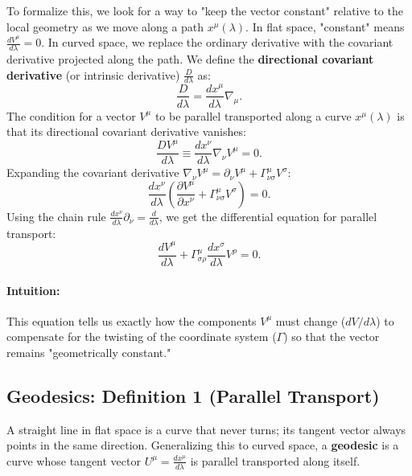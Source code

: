 \documentclass[11pt, a4paper]{report}
\begin{document}
To formalize this, we look for a way to "keep the vector constant" relative to the local geometry as we move along a path \(x^\mu(\lambda)\). In flat space, "constant" means \(\frac{d V^\mu}{d\lambda} = 0\). In curved space, we replace the ordinary derivative with the covariant derivative projected along the path. We define the \textbf{directional covariant derivative} (or intrinsic derivative) \(\frac{D}{d\lambda}\) as:
\begin{equation}
\frac{D}{d\lambda} = \frac{dx^\mu}{d\lambda} \nabla_\mu.
\end{equation}
The condition for a vector \(V^\mu\) to be parallel transported along a curve \(x^\mu(\lambda)\) is that its directional covariant derivative vanishes:
\begin{equation}
\label{eq:parallel_transport}
\frac{D V^\mu}{d\lambda} \equiv \frac{dx^\nu}{d\lambda} \nabla_\nu V^\mu = 0.
\end{equation}
Expanding the covariant derivative \(\nabla_\nu V^\mu = \partial_\nu V^\mu + \Gamma^\mu_{\nu\sigma} V^\sigma\):
\begin{equation}
\frac{dx^\nu}{d\lambda} \left( \frac{\partial V^\mu}{\partial x^\nu} + \Gamma^\mu_{\nu\sigma} V^\sigma \right) = 0.
\end{equation}
Using the chain rule \(\frac{dx^\nu}{d\lambda} \partial_\nu = \frac{d}{d\lambda}\), we get the differential equation for parallel transport:
\begin{equation}
\frac{d V^\mu}{d\lambda} + \Gamma^\mu_{\sigma\rho} \frac{dx^\sigma}{d\lambda} V^\rho = 0.
\end{equation}
\paragraph{Intuition:} This equation tells us exactly how the components \(V^\mu\) must change (\(dV/d\lambda\)) to compensate for the twisting of the coordinate system (\(\Gamma\)) so that the vector remains "geometrically constant."

\subsection*{Geodesics: Definition 1 (Parallel Transport)}
A straight line in flat space is a curve that never turns; its tangent vector always points in the same direction. Generalizing this to curved space, a \textbf{geodesic} is a curve whose tangent vector \(U^\mu = \frac{dx^\mu}{d\lambda}\) is parallel transported along itself.
\end{document}
